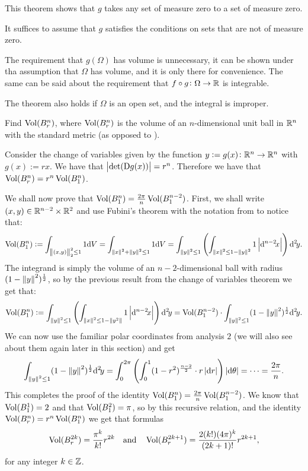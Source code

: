 \documentclass[11pt,a4paper]{article}
\begin{document}
\begin{remark}
  This theorem shows that $g$ takes any set of measure zero to a
  set of measure zero.
\end{remark}
\begin{remark}
  It suffices to assume that $g$ satisfies the conditions on sets that
  are not of measure zero.
\end{remark}
\begin{remark}
  The requirement that $g(\Omega)$ has volume is unnecessary,
  it can be shown under tha assumption that $\Omega$ has volume,
  and it is only there for convenience.
  The same can be said about the requirement that
  $f \circ g \colon \Omega \to \mathbb{R}$ is integrable.
\end{remark}
\begin{remark}
  The theorem also holds if $\Omega$ is an open set,
  and the integral is improper.
\end{remark}

\begin{exercise}
  Find $\operatorname{Vol}(B_r^n)$, where $\operatorname{Vol}(B_r^n)$ is the volume of
  an $n$-dimensional unit ball in $\mathbb{R}^n$ with the standard metric
  (as opposed to ).
\end{exercise}
\begin{solution}
  Consider the change of variables given by the function
  $y := g(x) \colon \mathbb{R}^n \to \mathbb{R}^n$ with $g(x) := r x$.
  We have that $\left\lvert\det(\mathrm{D} g(x))\right\rvert = r^n$.
  Therefore we have that $\operatorname{Vol}(B_r^n) = r^n \operatorname{Vol}(B_1^n)$.

  We shall now prove that $\operatorname{Vol}(B_1^n) = \frac{2\pi}{n} \operatorname{Vol}(B_1^{n-2})$.
  First, we shall write $(x,y) \in \mathbb{R}^{n-2} \times \mathbb{R}^{2}$ and use Fubini's
  theorem with the notation from  to notice that:
  \[
    \Vol(B_1^n) :=
    \int_{\norm{(x,y)}_2^2 \le 1} 1 \dV =
    \int_{\norm{x}^2 + \norm{y}^2 \le 1} 1 \dV =
    \int_{\norm{y}^2 \le 1}
      \del{\int_{\norm{x}^2 \le 1 - \norm{y}^2} 1 \abs{\dx[n-2]}} \dy[2].
  \]
  The integrand is simply the volume of an $n-2$-dimensional ball
  with radius $(1 - \left\lVert y\right\rVert^2)^{\frac{1}{2}}$,
  so by the previous result from the change of variables theorem
  we get that:
  \[
    \Vol(B_1^n) :=
    \int_{\norm{y}^2 \le 1}
      \del{\int_{\norm{x}^2 \le 1 - \norm{y^2}} 1 \abs{\dx[n-2]}} \dy[2] =
    \Vol(B_1^{n-2}) \cdot
      \int_{\norm{y}^2 \le 1} (1 - \norm{y}^2)^{\half} \dy[2].
  \]
  We can now use the familiar polar coordinates from analysis $2$
  (we will also see about them again later in this section) and get
  \[
    \int_{\norm{y}^2 \le 1} (1 - \norm{y}^2)^{\half} \dy[2] =
    \int_{0}^{2\pi} \del{\int_{0}^{1} (1 - r^2)^{\frac{n-2}{2}} \cdot r \abs{\dr}} \abs{\dtheta} = \cdots = \frac{2\pi}{n}.
  \]
  This completes the proof of
  the identity $\operatorname{Vol}(B_1^n) = \frac{2\pi}{n} \operatorname{Vol}(B_1^{n-2})$.
  We know that $\operatorname{Vol}(B_1^1) = 2$ and that $\operatorname{Vol}(B_1^2) = \pi$,
  so by this recursive relation,
  and the identity $\operatorname{Vol}(B_r^n) = r^n \operatorname{Vol}(B_1^n)$
  we get that formulas
  \[
    \operatorname{Vol}(B_r^{2k}) = \frac{\pi^k}{k!} r^{2k} \quad \text{and} \quad
    \operatorname{Vol}(B_r^{2k+1}) = \frac{2(k!)(4\pi)^k}{(2k+1)!} r^{2k+1},
  \]
  for any integer $k \in \mathbb{Z}$.
\end{solution}
\end{document}
